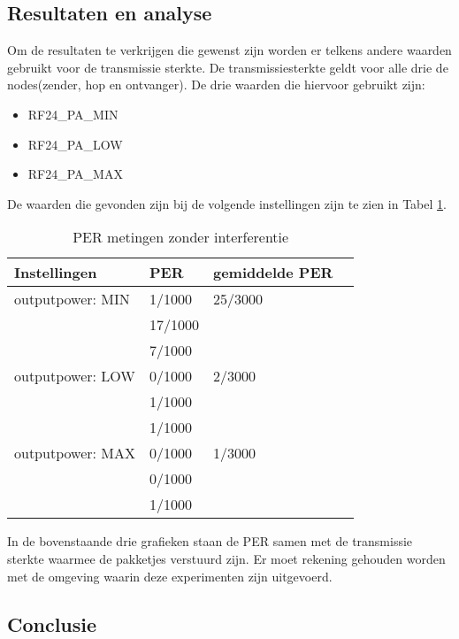 \documentclass{article}
\begin{document}
\subsection{Resultaten en analyse}

Om de resultaten te verkrijgen die gewenst zijn worden er telkens andere waarden gebruikt voor de transmissie sterkte.
De transmissiesterkte geldt voor alle drie de nodes(zender, hop en ontvanger). De drie waarden die hiervoor gebruikt zijn:

\begin{itemize}
	\item RF24\_PA\_MIN
	\item RF24\_PA\_LOW
	\item RF24\_PA\_MAX
\end{itemize}
De waarden die gevonden zijn bij de volgende instellingen zijn te zien in Tabel \ref{table:hopresults}.

\begin{table}[h]
\centering \caption{PER metingen zonder interferentie}
\label{table:hopresults}
    \begin{tabular}{ | l | l | l | p{5cm} |}
    \hline
    Instellingen 				& PER 		& gemiddelde PER\\ \hline
    outputpower: MIN 			& 1/1000 	& 25/3000		\\
    							& 17/1000 	& 				\\
   								& 7/1000	&  				\\ \hline
    outputpower: LOW 			& 0/1000 	& 2/3000		\\
    							& 1/1000 	& 				\\
   								& 1/1000	&  				\\ \hline
    outputpower: MAX 			& 0/1000 	& 1/3000		\\
    							& 0/1000 	& 				\\
   								& 1/1000	&  				\\ \hline
    \end{tabular}
\end{table}

In de bovenstaande drie grafieken staan de PER samen met de transmissie sterkte waarmee de pakketjes verstuurd zijn. Er moet rekening gehouden worden met de omgeving waarin deze experimenten zijn uitgevoerd. 

\subsection{Conclusie}
\end{document}
